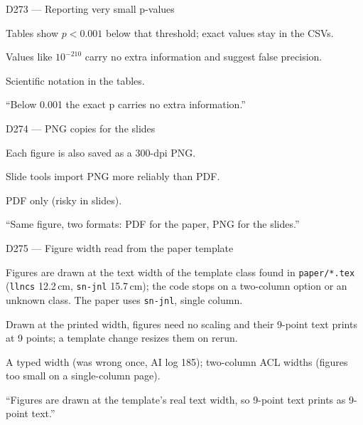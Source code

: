 \documentclass[11pt,a4paper]{report}
\begin{document}
\begin{decisionbox}{D273 --- Reporting very small p-values}
\begin{description}[nosep, leftmargin=0pt]
  \item[Decision.] Tables show $p<0.001$ below that threshold; exact values stay in the CSVs.
  \item[Why.] Values like $10^{-210}$ carry no extra information and suggest false precision.
  \item[Alternatives.] Scientific notation in the tables.
  \item[Interview line.] ``Below 0.001 the exact p carries no extra information.''
\end{description}
\end{decisionbox}

\begin{decisionbox}{D274 --- PNG copies for the slides}
\begin{description}[nosep, leftmargin=0pt]
  \item[Decision.] Each figure is also saved as a 300-dpi PNG.
  \item[Why.] Slide tools import PNG more reliably than PDF.
  \item[Alternatives.] PDF only (risky in slides).
  \item[Interview line.] ``Same figure, two formats: PDF for the paper, PNG for the slides.''
\end{description}
\end{decisionbox}

\begin{decisionbox}{D275 --- Figure width read from the paper template}
\begin{description}[nosep, leftmargin=0pt]
  \item[Decision.] Figures are drawn at the text width of the template class found in \texttt{paper/*.tex} (\texttt{llncs} 12.2\,cm, \texttt{sn-jnl} 15.7\,cm); the code stops on a two-column option or an unknown class. The paper uses \texttt{sn-jnl}, single column.
  \item[Why.] Drawn at the printed width, figures need no scaling and their 9-point text prints at 9 points; a template change resizes them on rerun.
  \item[Alternatives.] A typed width (was wrong once, AI log 185); two-column ACL widths (figures too small on a single-column page).
  \item[Interview line.] ``Figures are drawn at the template's real text width, so 9-point text prints as 9-point text.''
\end{description}
\end{decisionbox}
\end{document}
